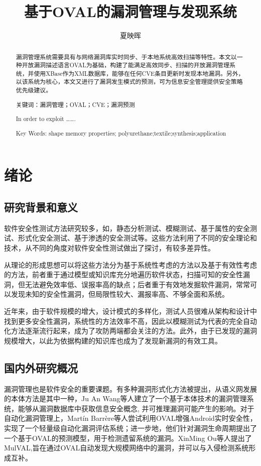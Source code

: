 \documentclass[a4paper]{ctexrep}
\title{基于OVAL的漏洞管理与发现系统}
\author{夏映晖}
\date{}
\begin{document}
	\maketitle
	\begin{abstract}
	漏洞管理系统需要具有与网络漏洞库实时同步、于本地系统高效扫描等特性。本文以一种开放漏洞描述语言OVAL为基础，构建了能满足高效同步、扫描的开放漏洞管理系统，并使用XBase作为XML数据库，能够在任何CVE条目更新时发现本地漏洞。另外，以该系统为核心，本文又进行了漏洞发生模式的预测，可为信息安全管理提供安全策略优先级建议。
	
	关键词：漏洞管理；OVAL；CVE；漏洞预测
	\end{abstract}
	\renewcommand\abstractname{abstract}
	\begin{abstract}
	In order to exploit …….
	
	Key Words: shape memory properties; polyurethane;textile;synthesis;application
	\end{abstract}
	\tableofcontents
	\newpage
	\setcounter{page}{1}
	\chapter{绪论}
		\section{研究背景和意义}
		软件安全性测试方法研究较多，如，静态分析测试、模糊测试、基于属性的安全测试、形式化安全测试、基于渗透的安全测试等。这些方法利用了不同的安全理论和技术，从不同的角度对软件安全性测试做出了探讨，有较多差异性。
		
		从理论的形成思想可以将这些方法分为基于系统性考虑的方法以及基于有效性考虑的方法，前者重于通过模型或知识库充分地遍历软件状态，扫描可知的安全性漏洞，但无法避免效率低、误报率高的缺点；后者重于有效地发掘软件漏洞，常常可以发现未知的安全性漏洞，但局限性较大、漏报率高、不够全面和系统。

		近年来，由于软件规模的增大，设计模式的多样化，测试人员很难从架构和设计中找到更多安全性漏洞，系统性的方法效率不高，因此以模糊测试为代表的完全自动化方法逐渐流行起来，成为了攻防两端都会关注的方法。此外，由于已发现的漏洞规模增大，以此为依据构建的知识库也成为了发现新漏洞的有效工具。
		\section{国内外研究概况} 
		漏洞管理也是软件安全的重要课题。有多种漏洞形式化方法被提出，从语义网发展的本体方法是其中一种，Ju An Wang等人建立了一个基于本体技术的漏洞管理系统，能够从漏洞数据库中获取信息安全概念, 并可推理漏洞可能产生的影响。对于自动化漏洞管理上，Martín Barrère等人尝试利用OVAL增强Android实时安全性，实现了一个轻量级自动化漏洞评估系统；进一步地，他们针对漏洞生命周期提出了一个基于OVAL的预测模型，用于检测遗留系统的漏洞。XinMing Ou等人提出了MulVAL,旨在通过OVAL自动发现大规模网络中的漏洞，并可以与入侵检测系统形成互补。
\end{document}
